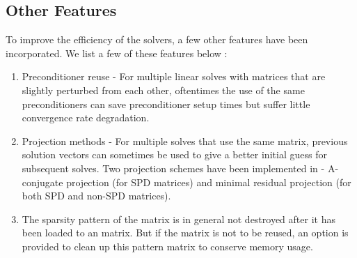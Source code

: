 \subsection{Other Features} 

To improve the efficiency of the \hypre{} solvers, a few other features have been
incorporated.  We list a few of these features below :

\begin{enumerate}
\item Preconditioner reuse - For multiple linear solves with matrices that are
      slightly perturbed from each other, oftentimes the use of the same 
      preconditioners can save preconditioner setup times but suffer little
      convergence rate degradation.
\item Projection methods - For multiple solves that use the same matrix,
      previous solution vectors can sometimes be used to give a better initial
      guess for subsequent solves.  Two projection schemes have been implemented
      in \hypre{} - A-conjugate projection (for SPD matrices) and minimal residual
      projection (for both SPD and non-SPD matrices).
\item The sparsity pattern of the matrix is in general not destroyed after
      it has been loaded to an \hypre{} matrix.  But if the matrix is not to
      be reused, an option is provided to clean up this pattern matrix to
      conserve memory usage.
\end{enumerate}
